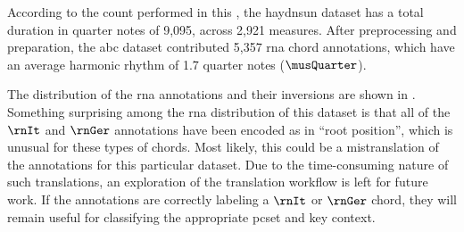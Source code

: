 
According to the count performed in this \thesisdiss{}, the
\gls{haydnsun} dataset has a total duration in quarter notes
of 9,095, across 2,921 measures. After preprocessing and
preparation, the \gls{abc} dataset contributed 5,357
\gls{rna} chord annotations, which have an average harmonic
rhythm of 1.7 quarter notes ($\musQuarter$).

The distribution of the \gls{rna} annotations and their
inversions are shown in .
Something surprising among the \gls{rna} distribution of
this dataset is that all of the $\rnIt$ and $\rnGer$
annotations have been encoded as in ``root position'', which
is unusual for these types of chords. Most likely, this
could be a mistranslation of the annotations for this
particular dataset. Due to the time-consuming nature of such
translations, an exploration of the translation workflow is
left for future work. If the annotations are correctly
labeling a $\rnIt$ or $\rnGer$ chord, they will remain
useful for classifying the appropriate \gls{pcset} and key
context.




